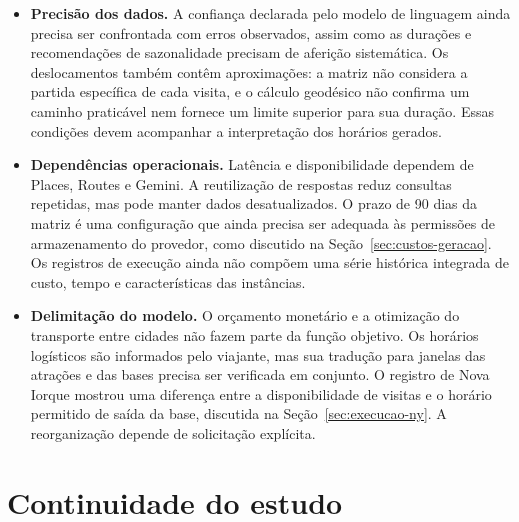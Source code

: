 \begin{itemize}
  \item \textbf{Precisão dos dados.} A confiança declarada pelo modelo de linguagem ainda precisa ser confrontada com erros observados, assim como as durações e recomendações de sazonalidade precisam de aferição sistemática. Os deslocamentos também contêm aproximações: a matriz não considera a partida específica de cada visita, e o cálculo geodésico não confirma um caminho praticável nem fornece um limite superior para sua duração. Essas condições devem acompanhar a interpretação dos horários gerados.
  \item \textbf{Dependências operacionais.} Latência e disponibilidade dependem de Places, Routes e Gemini. A reutilização de respostas reduz consultas repetidas, mas pode manter dados desatualizados. O prazo de 90 dias da matriz é uma configuração que ainda precisa ser adequada às permissões de armazenamento do provedor, como discutido na Seção~\ref{sec:custos-geracao}. Os registros de execução ainda não compõem uma série histórica integrada de custo, tempo e características das instâncias.
  \item \textbf{Delimitação do modelo.} O orçamento monetário e a otimização do transporte entre cidades não fazem parte da função objetivo. Os horários logísticos são informados pelo viajante, mas sua tradução para janelas das atrações e das bases precisa ser verificada em conjunto. O registro de Nova Iorque mostrou uma diferença entre a disponibilidade de visitas e o horário permitido de saída da base, discutida na Seção~\ref{sec:execucao-ny}. A reorganização depende de solicitação explícita.
\end{itemize}

\section{Continuidade do estudo}

